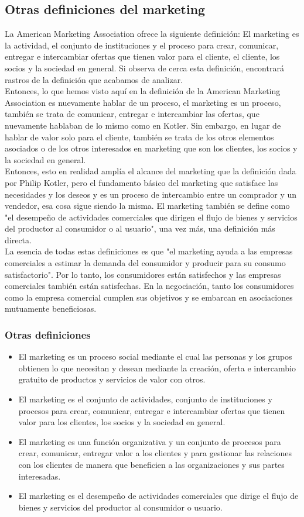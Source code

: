 \documentclass[10pt]{book}
\begin{document}
\subsection{Otras definiciones del marketing}
La American Marketing Association ofrece la siguiente definición: El marketing es la actividad, el conjunto de instituciones y el proceso para crear, comunicar, entregar e intercambiar ofertas que tienen valor para el cliente, el cliente, los socios y la sociedad en general. Si observa de cerca esta definición, encontrará rastros de la definición que acabamos de analizar.\\
Entonces, lo que hemos visto aquí en la definición de la American Marketing Association es nuevamente hablar de un proceso, el marketing es un proceso, también se trata de comunicar, entregar e intercambiar las ofertas, que nuevamente hablaban de lo mismo como en Kotler. Sin embargo, en lugar de hablar de valor solo para el cliente, también se trata de los otros elementos asociados o de los otros interesados en marketing que son los clientes, los socios y la sociedad en general.\\
Entonces, esto en realidad amplía el alcance del marketing que la definición dada por Philip Kotler, pero el fundamento básico del marketing que satisface las necesidades y los deseos y es un proceso de intercambio entre un comprador y un vendedor, esa cosa sigue siendo la misma. El marketing también se define como "el desempeño de actividades comerciales que dirigen el flujo de bienes y servicios del productor al consumidor o al usuario", una vez más, una definición más directa.\\
La esencia de todas estas definiciones es que "el marketing ayuda a las empresas comerciales a estimar la demanda del consumidor y producir para su consumo satisfactorio". Por lo tanto, los consumidores están satisfechos y las empresas comerciales también están satisfechas. En la negociación, tanto los consumidores como la empresa comercial cumplen sus objetivos y se embarcan en asociaciones mutuamente beneficiosas.
\subsubsection{Otras definiciones}
\begin{itemize}
\item El marketing es un proceso social mediante el cual las personas y los grupos obtienen lo que necesitan y desean mediante la creación, oferta e intercambio gratuito de productos y servicios de valor con otros.
\item El marketing es el conjunto de actividades, conjunto de instituciones y procesos para crear, comunicar, entregar e intercambiar ofertas que tienen valor para los clientes, los socios y la sociedad en general.
\item El marketing es una función organizativa y un conjunto de procesos para crear, comunicar, entregar valor a los clientes y para gestionar las relaciones con los clientes de manera que beneficien a las organizaciones y sus partes interesadas.
\item El marketing es el desempeño de actividades comerciales que dirige el flujo de bienes y servicios del productor al consumidor o usuario.
\end{itemize}
\end{document}
